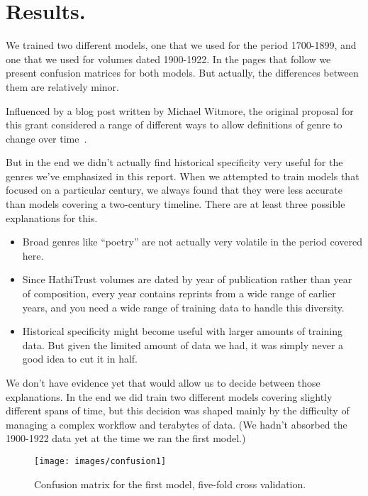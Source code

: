 \documentclass[paper=a4, fontsize=12pt]{scrartcl}
\numberwithin{equation}{section}		%
\numberwithin{figure}{section}			%
\numberwithin{table}{section}				%
\begin{document}
\section{Results.}

We trained two different models, one that we used for the period 1700-1899, and one that we used for volumes dated 1900-1922. In the pages that follow we present confusion matrices for both models. But actually, the differences between them are relatively minor.

Influenced by a blog post written by Michael Witmore, the original proposal for this grant considered a range of different ways to allow definitions of genre to change  over time~\cite{witmore:time, underwood:mutable}.

But in the end we didn't actually find historical specificity very useful for the genres we've emphasized in this report. When we attempted to train models that focused on a particular century, we always found that they were less accurate than models covering a two-century timeline. There are at least three possible explanations for this.

\begin{itemize}
\item Broad genres like ``poetry'' are not actually very volatile in the period covered here.
\item Since HathiTrust volumes are dated by year of publication rather than year of composition, every year contains reprints from a wide range of earlier years, and you need a wide range of training data to handle this diversity.
\item Historical specificity might become useful with larger amounts of training data. But given the limited amount of data we had, it was simply never a good idea to cut it in half.
\end{itemize}

We don't have evidence yet that would allow us to decide between those explanations. In the end we did train two different models covering slightly different spans of time, but this decision was shaped mainly by the difficulty of managing a complex workflow and terabytes of data. (We hadn't absorbed the 1900-1922 data yet at the time we ran the first model.)

\begin{figure}[!h]
\centering
\texttt{[image: images/confusion1]}
\caption{Confusion matrix for the first model, five-fold cross validation.}
\label{confusion1}
\end{figure}
\end{document}
